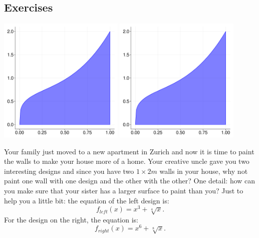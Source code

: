 \documentclass[a4paper]{report}
\begin{document}
\subsection{Exercises}

\begin{Exercise}[title=Painting a wall, difficulty=1,label=ex0202]
\begin{center}
\includegraphics[width=0.45\textwidth,page=1]{ex_int.pdf}
\includegraphics[width=0.45\textwidth,page=2]{ex_int.pdf}
\end{center}
Your family just moved to a new apartment in Zurich and now it is time to paint the walls to make your house more of a home. Your creative uncle gave you two interesting designs and since you have two $1\times2 m$ walls in your house, why not paint one wall with one design and the other with the other? One detail: how can you make sure that your sister has a larger surface to paint than you? Just to help you a little bit: the equation of the left design is:
\begin{equation*}
f_{left}(x) = x^3 + \sqrt[4]{x}.
\end{equation*}
For the design on the right, the equation is:
\begin{equation*}
f_{right}(x) = x^6 + \sqrt[8]{x}.
\end{equation*}
\end{Exercise}
\end{document}
